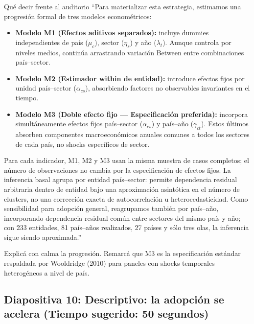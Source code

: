 \documentclass[11pt,a4paper]{article}
\begin{document}
\begin{speechbox}{Qué decir frente al auditorio}
``Para materializar esta estrategia, estimamos una progresión formal de tres modelos econométricos:
\begin{itemize}[itemsep=0.2em]
  \item \textbf{Modelo M1 (Efectos aditivos separados):} incluye dummies independientes de país ($\mu_c$), sector ($\eta_s$) y año ($\lambda_t$). Aunque controla por niveles medios, continúa arrastrando variación Between entre combinaciones país--sector.
  \item \textbf{Modelo M2 (Estimador within de entidad):} introduce efectos fijos por unidad país--sector ($\alpha_{cs}$), absorbiendo factores no observables invariantes en el tiempo.
  \item \textbf{Modelo M3 (Doble efecto fijo --- Especificación preferida):} incorpora simultáneamente efectos fijos país--sector ($\alpha_{cs}$) y país--año ($\gamma_{ct}$). Estos últimos absorben componentes macroeconómicos anuales comunes a todos los sectores de cada país, no shocks específicos de sector.
\end{itemize}
Para cada indicador, M1, M2 y M3 usan la misma muestra de casos completos; el número de observaciones no cambia por la especificación de efectos fijos. La inferencia basal agrupa por entidad país--sector: permite dependencia residual arbitraria dentro de entidad bajo una aproximación asintótica en el número de clusters, no una corrección exacta de autocorrelación u heterocedasticidad. Como sensibilidad para adopción general, reagrupamos también por país--año, incorporando dependencia residual común entre sectores del mismo país y año; con 233 entidades, 81 país--años realizados, 27 países y sólo tres olas, la inferencia sigue siendo aproximada.''
\end{speechbox}

\begin{tipbox}
Explicá con calma la progresión. Remarcá que M3 es la especificación estándar respaldada por Wooldridge (2010) para paneles con shocks temporales heterogéneos a nivel de país.
\end{tipbox}

\subsection*{Diapositiva 10: Descriptivo: la adopción se acelera (Tiempo sugerido: 50 segundos)}
\end{document}
